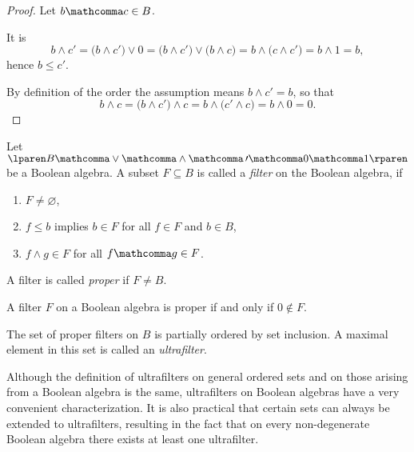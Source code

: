 \begin{proof}
  Let $b \mathcomma c \in B$.

  \fbox{$\Rightarrow$}
  It is
  \[
    b \wedge c \prime
    \equal
    \lparen b \wedge c \prime \rparen \vee 0
    \equal
    \lparen b \wedge c \prime \rparen \vee \lparen b \wedge c \rparen
    \equal
    b \wedge \lparen c \wedge c \prime \rparen
    \equal
    b \wedge 1
    \equal
    b,
  \]
  hence $b \leq c \prime$.

  \fbox{$\Leftarrow$}
  By definition of the order the assumption means
  $b \wedge c \prime \equal b$,
  so that
  \[
    b \wedge c
    \equal
    \lparen b \wedge c \prime \rparen \wedge c
    \equal
    b \wedge \lparen c \prime \wedge c \rparen
    \equal
    b \wedge 0
    \equal
    0.
  \]
\end{proof}

\begin{definition}
  Let
  $\lparen B \mathcomma \vee \mathcomma \wedge \mathcomma \, \prime
  \mathcomma 0 \mathcomma 1 \rparen$
  be a Boolean algebra.
  A subset $F \subseteq B$ is called a \emph{filter} on the Boolean algebra,
  if
  \begin{enumerate}
    \item $F \neq \varnothing$,
    \item $f \leq b$ implies $b \in F$ for all $f \in F$ and $b \in B$,
    \item $f \wedge g \in F$ for all $f \mathcomma g \in F$.
  \end{enumerate}
  A filter is called \emph{proper} if $F \ne B$.
\end{definition}

\begin{remark}
  A filter $F$ on a Boolean algebra is proper if and only if $0 \notin F$.
\end{remark}

\pagebreak

\begin{definition}
  The set of proper filters on $B$ is partially ordered by set inclusion.
  A maximal element in this set is called an \emph{ultrafilter}.
\end{definition}

\medskip

Although the definition of ultrafilters on general ordered sets
and on those arising from a Boolean algebra is the same,
ultrafilters on Boolean algebras have a very convenient characterization.
It is also practical that certain sets can always be extended to ultrafilters,
resulting in the fact
that on every non-degenerate Boolean algebra there exists
at least one ultrafilter.

